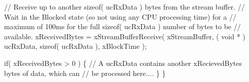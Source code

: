 \begin{DoxyPre}    // Receive up to another sizeof( ucRxData ) bytes from the stream buffer.
    // Wait in the Blocked state (so not using any CPU processing time) for a
    // maximum of 100ms for the full sizeof( ucRxData ) number of bytes to be
    // available.
    xReceivedBytes = xStreamBufferReceive( xStreamBuffer,
                                           ( void * ) ucRxData,
                                           sizeof( ucRxData ),
                                           xBlockTime );\end{DoxyPre}



\begin{DoxyPre}    if( xReceivedBytes > 0 )
    \{
        // A ucRxData contains another xRecievedBytes bytes of data, which can
        // be processed here....
    \}
\}
\end{DoxyPre}
 